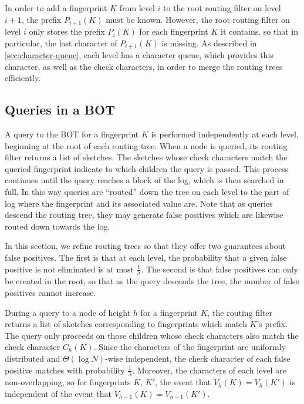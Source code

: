 In order to add a fingerprint $K$ from level $i$ to the root routing filter on
level $i+1$, the prefix $P_{i+1}(K)$ must be known. However, the root routing
filter on level $i$ only stores the prefix $P_i(K)$ for each fingerprint $K$ it
contains, so that in particular, the last character of $P_{i+1}(K)$ is missing.
As described in \cref{sec:character-queue}, each level has a character queue,
which provides this character, as well as the check characters, in order to
merge the routing trees efficiently.

\subsection{Queries in a BOT}\label{sec:routing-tree-query}

A query to the BOT for a fingerprint $K$ is performed independently at each
level, beginning at the root of each routing tree. When a node is queried, its
routing filter returns a list of sketches. The sketches whose check characters
match the queried fingerprint indicate to which children the query is passed.
This process continues until the query reaches a block of the log, which is
then searched in full. In this way queries are ``routed'' down the tree on each
level to the part of log where the fingerprint and its associated value are.
Note that as queries descend the routing tree, they may generate false
positives which are likewise routed down towards the log.

In this section, we refine routing trees so that they offer two guarantees
about false positives. The first is that at each level, the probability that a
given false positive is not eliminated is at most $\frac{1}{\lambda}$. The
second is that false positives can only be created in the root, so that as the
query descends the tree, the number of false positives cannot increase.

During a query to a node of height $h$ for a fingerprint $K$, the routing
filter returns a list of sketches corresponding to fingerprints which match
$K$'s prefix. The query only proceeds on those children whose check characters
also match the check character $C_h(K)$. Since the characters of the
fingerprint are uniformly distributed and $\Theta(\log N)$-wise independent,
the check character of each false positive matches with probability
$\frac{1}{\lambda}$.  Moreover, the characters of each level are
non-overlapping, so for fingerprints $K$, $K'$, the event that $V_h(K)=V_h(K')$
is independent of the event that $V_{h-1}(K)=V_{h-1}(K')$.

